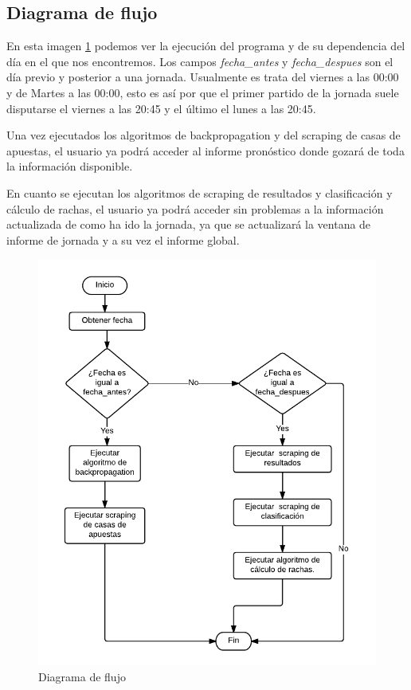 \subsection{Diagrama de flujo}
En esta imagen \ref{fig:DiagFluj} podemos ver la ejecución del programa y de su dependencia del día en el que nos encontremos. Los campos \textit{fecha\_antes} y \textit{fecha\_despues} son el día previo y posterior a una jornada. Usualmente es trata del viernes a las 00:00 y  de Martes a las 00:00, esto es así por que el primer partido de la jornada suele disputarse el viernes a las 20:45 y el último el lunes a las 20:45.

Una vez ejecutados los algoritmos de backpropagation y del scraping de casas de apuestas, el usuario ya podrá acceder al informe pronóstico donde gozará de toda la información disponible.

En cuanto se ejecutan los algoritmos de scraping de resultados y clasificación y cálculo de rachas, el usuario ya podrá acceder sin problemas a la información actualizada de como ha ido la jornada, ya que se actualizará la ventana de informe de jornada y a su vez el informe global.
\begin{figure}
\centering
\includegraphics[width=.9\textwidth]{img/diagrama_flujo}
\caption{Diagrama de flujo}
\label{fig:DiagFluj}
\end{figure}

